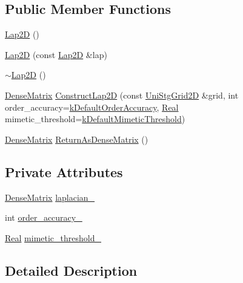 \subsection*{Public Member Functions}
\begin{DoxyCompactItemize}
\item 
\hyperlink{classmtk_1_1Lap2D_ada4370fb8d7726e70a3257e3841c6d1f}{Lap2\-D} ()
\item 
\hyperlink{classmtk_1_1Lap2D_acf62bf6a1c041e4b02f06346054d7af2}{Lap2\-D} (const \hyperlink{classmtk_1_1Lap2D}{Lap2\-D} \&lap)
\item 
\hyperlink{classmtk_1_1Lap2D_a8ca8447a4da7a5ddcf826486992374a5}{$\sim$\-Lap2\-D} ()
\item 
\hyperlink{classmtk_1_1DenseMatrix}{Dense\-Matrix} \hyperlink{classmtk_1_1Lap2D_a70b0cb8c1e803bf368dc3a1f6c50eda6}{Construct\-Lap2\-D} (const \hyperlink{classmtk_1_1UniStgGrid2D}{Uni\-Stg\-Grid2\-D} \&grid, int order\-\_\-accuracy=\hyperlink{group__c01-roots_ga0d95560098eb36420511103637b6952f}{k\-Default\-Order\-Accuracy}, \hyperlink{group__c01-roots_gac080bbbf5cbb5502c9f00405f894857d}{Real} mimetic\-\_\-threshold=\hyperlink{group__c01-roots_ga35718d949bdc81a08a9cc8ebbe3478a2}{k\-Default\-Mimetic\-Threshold})
\item 
\hyperlink{classmtk_1_1DenseMatrix}{Dense\-Matrix} \hyperlink{classmtk_1_1Lap2D_a311153e59550e6a4b75e2edee33a5c5b}{Return\-As\-Dense\-Matrix} ()
\end{DoxyCompactItemize}
\subsection*{Private Attributes}
\begin{DoxyCompactItemize}
\item 
\hyperlink{classmtk_1_1DenseMatrix}{Dense\-Matrix} \hyperlink{classmtk_1_1Lap2D_a6c52889838324a89f85ed37bd3bf44f4}{laplacian\-\_\-}
\item 
int \hyperlink{classmtk_1_1Lap2D_a9c4fdfe20a093b19f3b3f7ff0c49f560}{order\-\_\-accuracy\-\_\-}
\item 
\hyperlink{group__c01-roots_gac080bbbf5cbb5502c9f00405f894857d}{Real} \hyperlink{classmtk_1_1Lap2D_a5501bd196f7307f64d6fa58da070196e}{mimetic\-\_\-threshold\-\_\-}
\end{DoxyCompactItemize}


\subsection{Detailed Description}


